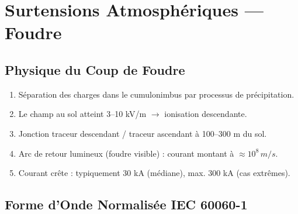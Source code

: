 \documentclass[12pt, a4paper, twoside]{report}
\begin{document}
\section{Surtensions Atmosphériques — Foudre}

\subsection{Physique du Coup de Foudre}

\begin{enumerate}
  \item Séparation des charges dans le cumulonimbus par processus de précipitation.
  \item Le champ au sol atteint 3--10 kV/m $\rightarrow$ ionisation descendante.
  \item Jonction traceur descendant / traceur ascendant à 100--300 m du sol.
  \item Arc de retour lumineux (foudre visible) : courant montant à $\approx 10^8\,\si{m/s}$.
  \item Courant crête : typiquement 30 kA (médiane), max. 300 kA (cas extrêmes).
\end{enumerate}

\subsection{Forme d'Onde Normalisée IEC 60060-1}
\end{document}
